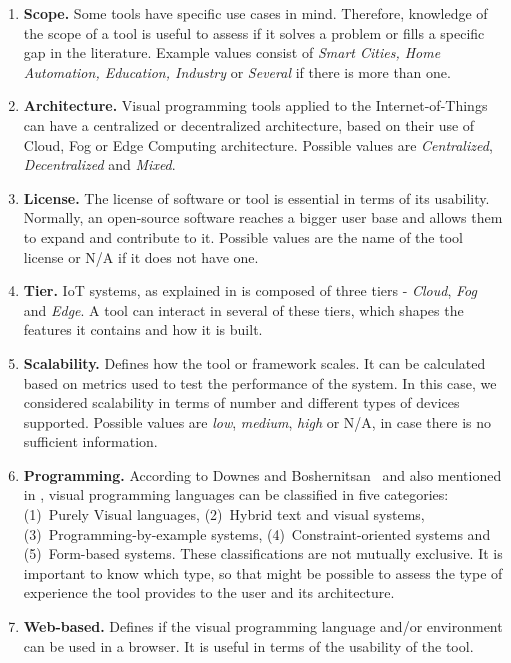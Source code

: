 \begin{enumerate}
    \item\textbf{Scope.} Some tools have specific use cases in mind. Therefore, knowledge of the scope of a tool is useful to assess if it solves a problem or fills a specific gap in the literature. Example values consist of \textit{Smart Cities, Home Automation, Education, Industry} or \textit{Several} if there is more than one. 
    \item\textbf{Architecture.} Visual programming tools applied to the Internet-of-Things can have a centralized or decentralized architecture, based on their use of Cloud, Fog or Edge Computing architecture. Possible values are \textit{Centralized}, \textit{Decentralized} and \textit{Mixed}.
    \item\textbf{License.} The license of software or tool is essential in terms of its usability. Normally, an open-source software reaches a bigger user base and allows them to expand and contribute to it. Possible values are the name of the tool license or N/A if it does not have one.
    \item\textbf{Tier.} IoT systems, as explained in  is composed of three tiers - \textit{Cloud}, \textit{Fog} and \textit{Edge}. A tool can interact in several of these tiers, which shapes the features it contains and how it is built.
    \item\textbf{Scalability.} Defines how the tool or framework scales. It can be calculated based on metrics used to test the performance of the system. In this case, we considered scalability in terms of number and different types of devices supported. Possible values are \textit{low}, \textit{medium}, \textit{high} or N/A, in case there is no sufficient information.
    \item\textbf{Programming.} According to Downes and Boshernitsan~\cite{vpls_survey} and also mentioned in , visual programming languages can be classified in five categories: (1)~Purely Visual languages, (2)~Hybrid text and visual systems, (3)~Programming-by-example systems, (4)~Constraint-oriented systems and (5)~Form-based systems. These classifications are not mutually exclusive. It is important to know which type, so that might be possible to assess the type of experience the tool provides to the user and its architecture.
    \item\textbf{Web-based.} Defines if the visual programming language and/or environment can be used in a browser. It is useful in terms of the usability of the tool.
\end{enumerate}

